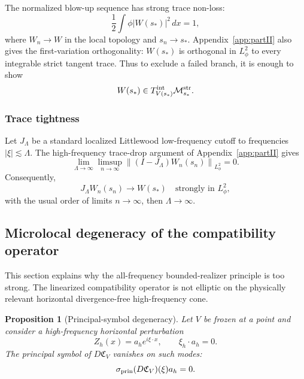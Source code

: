 \documentclass[11pt]{article}
\numberwithin{equation}{section}
\theoremstyle{plain}
\newtheorem{proposition}{Proposition}[section]
\theoremstyle{definition}
\theoremstyle{remark}
\newcommand{\dx}{\,dx}
\newcommand{\norm}[2]{\left\|#1\right\|_{#2}}
\newcommand{\Mstr}{\mathcal M^{\rm str}}
\newcommand{\Tint}{T^{\rm int}}
\newcommand{\calC}{\mathfrak C}
\begin{document}
The normalized blow-up sequence has strong trace non-loss:
\begin{equation}\label{pIV:eq:trace-nonloss}
        \frac12\int \phi |W(s_*)|^2\dx=1,
\end{equation}
where \(W_n\to W\) in the local topology and \(s_n\to s_*\).  Appendix~\ref{app:partII} also gives the
first-variation orthogonality: \(W(s_*)\) is orthogonal in \(L^2_\phi\) to every
integrable strict tangent trace.  Thus to exclude a failed branch, it is enough to
show
\begin{equation}\label{pIV:eq:tangent-cone-target}
        W(s_*)\in \Tint_{V(s_*)}\Mstr_{s_*}.
\end{equation}

\subsubsection{Trace tightness}

Let \(J_\Lambda\) be a standard localized Littlewood low-frequency cutoff to
frequencies \(|\xi|\lesssim \Lambda\).  The high-frequency trace-drop argument of
Appendix~\ref{app:partII} gives
\begin{equation}\label{pIV:eq:trace-tightness}
        \lim_{\Lambda\to\infty}\limsup_{n\to\infty}
        \norm{(I-J_\Lambda)W_n(s_n)}{L^2_\phi}=0.
\end{equation}
Consequently,
\begin{equation}\label{pIV:eq:low-trace-convergence}
        J_\Lambda W_n(s_n)\to W(s_*)
        \quad\text{strongly in }L^2_\phi,
\end{equation}
with the usual order of limits \(n\to\infty\), then \(\Lambda\to\infty\).

\subsection{Microlocal degeneracy of the compatibility operator}\label{pIV:sec:microlocal}

This section explains why the all-frequency bounded-realizer principle is too strong.
The linearized compatibility operator is not elliptic on the physically relevant
horizontal divergence-free high-frequency cone.

\begin{proposition}[Principal-symbol degeneracy]\label{pIV:prop:symbol-degeneracy}
Let \(V\) be frozen at a point and consider a high-frequency horizontal perturbation
\[
        Z_h(x)=a_h e^{i\xi\cdot x},
        \qquad
        \xi_h\cdot a_h=0.
\]
The principal symbol of \(D\calC_V\) vanishes on such modes:
\begin{equation}\label{pIV:eq:symbol-vanish}
        \sigma_{\rm prin}(D\calC_V)(\xi)a_h=0.
\end{equation}
\end{proposition}
\end{document}
